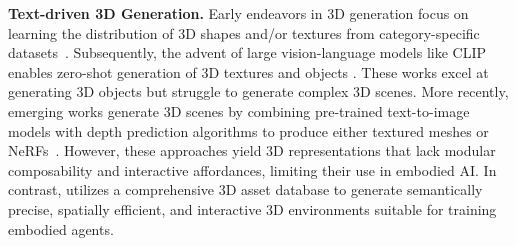 \smallbreak
\noindent\textbf{Text-driven 3D Generation.} Early endeavors in 3D generation focus on learning the distribution of 3D shapes and/or textures from category-specific datasets~\cite{wu2016learning,yang2019pointflow,zhou20213d,henzler2019escaping,nguyen2019hologan}. 
Subsequently, the advent of large vision-language models like CLIP~\cite{radford2021learning} enables zero-shot generation of 3D textures and objects \cite{huang2023aladdin,mildenhall2021nerf,poole2022dreamfusion,metzer2023latent,lin2023magic3d,gu2023nerfdiff}.
These works excel at generating 3D objects but struggle to generate complex 3D scenes. %
More recently, emerging works generate 3D scenes by combining pre-trained text-to-image models with depth prediction 
algorithms to produce either textured meshes or NeRFs~\cite{fridman2023scenescape,hollein2023text2room,zhang2023text2nerf}. However, these approaches yield 3D representations that lack modular composability and interactive affordances, limiting their use in embodied AI. In contrast, \holodeck utilizes a comprehensive 3D asset database to generate semantically precise, spatially efficient, and interactive 3D environments suitable for training embodied agents.

